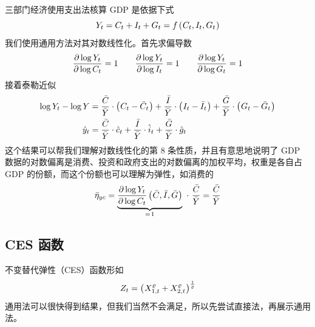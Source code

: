 三部门经济使用支出法核算 GDP 是依据下式
\begin{equation}
    Y_t=C_t+I_t+G_t=f\bka{C_t,I_t,G_t}\notag
\end{equation}
我们使用通用方法对其对数线性化。首先求偏导数
\begin{equation}
    \dfrac{\partial\log Y_t}{\partial\log C_t}=1 \qquad \dfrac{\partial\log Y_t}{\partial\log I_t}=1 \qquad \dfrac{\partial\log Y_t}{\partial\log G_t}=1\notag
\end{equation}
接着泰勒近似
\begin{align}
    \log Y_t-\log Y&=\dfrac{\bar C}{\bar Y}\cdot \bka{C_t-\bar C_t} + \dfrac{\bar I}{\bar Y}\cdot \bka{I_t-\bar I_t} + \dfrac{\bar G}{\bar Y}\cdot\bka{G_t-\bar G_t}\notag\\
    \hat y_t &=\frac{\bar C}{\bar Y}\cdot \hat c_t + \frac{\bar I}{\bar Y}\cdot \hat i_t + \frac{\bar G}{\bar Y}\cdot \hat g_t\label{eq:LogLineGDP}
\end{align}
这个结果可以帮我们理解对数线性化的第 8 条性质，并且有意思地说明了 GDP 数据的对数偏离是消费、投资和政府支出的对数偏离的加权平均，权重是各自占 GDP 的份额，而这个份额也可以理解为弹性，如消费的
\begin{equation}
    \bar\eta_{yc}=\underbrace{\dfrac{\partial\log Y_t}{\partial\log C_t}\bka{\bar C,\bar I,\bar G}}_{=\,1} \ \cdot \ \dfrac{\bar C}{\bar Y}=\dfrac{\bar C}{\bar Y}
\end{equation}

\subsection{CES 函数}\label{subsec:exCES}

不变替代弹性（CES）函数形如
\begin{equation}
    Z_t=\bka{X_{1,t}^{\varrho}+X_{2,t}^{\varrho}}^{\frac1\varrho}\label{eq:CESExample}
\end{equation}
通用法可以很快得到结果，但我们当然不会满足，所以先尝试直接法，再展示通用法。


